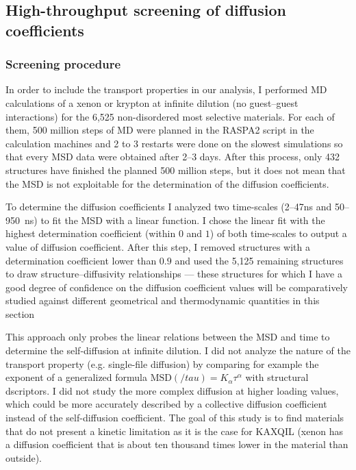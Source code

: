 \documentclass[main]{subfiles}
\begin{document}
\subsection{High-throughput screening of diffusion coefficients}

\subsubsection{Screening procedure}

In order to include the transport properties in our analysis, I performed MD calculations of a xenon or krypton at infinite dilution (no guest--guest interactions) for the 6,525 non-disordered most selective materials. For each of them, 500 million steps of MD were planned in the RASPA2 script in the calculation machines and 2 to 3 restarts were done on the slowest simulations so that every MSD data were obtained after 2--3 days. After this process, only 432 structures have finished the planned 500 million steps, but it does not mean that the MSD is not exploitable for the determination of the diffusion coefficients. 

To determine the diffusion coefficients I analyzed two time-scales (2--47\si{\ns} and 50--950~\si{\ns}) to fit the MSD with a linear function. I chose the linear fit with the highest determination coefficient (within $0$ and $1$) of both time-scales to output a value of diffusion coefficient. After this step, I removed structures with a determination coefficient lower than $0.9$ and used the 5,125 remaining structures to draw structure--diffusivity relationships --- these structures for which I have a good degree of confidence on the diffusion coefficient values will be comparatively studied against different geometrical and thermodynamic quantities in this section

This approach only probes the linear relations between the MSD and time to determine the self-diffusion at infinite dilution. I did not analyze the nature of the transport property (e.g. single-file diffusion\autocite{Lin_2005}) by comparing for example the exponent of a generalized formula $\text{MSD}(/tau) = K_\alpha\tau^\alpha$ with structural dscriptors. I did not study the more complex diffusion at higher loading values, which could be more accurately described by a collective diffusion coefficient instead of the self-diffusion coefficient. The goal of this study is to find materials that do not present a kinetic limitation as it is the case for KAXQIL\autocite{Banerjee2012} (xenon has a diffusion coefficient that is about ten thousand times lower in the material than outside).
\end{document}
